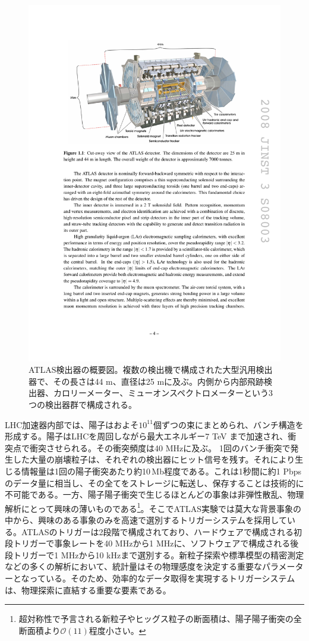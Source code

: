 \begin{figure} 
    \centering
    \includegraphics[width=16cm]{fig/Intro/ATLASdetector.pdf}
    \caption[ATLAS検出器の概要]{ATLAS検出器の概要図\cite{JINST:2008}。複数の検出機で構成された大型汎用検出器で、その長さは44 m、直径は25 mに及ぶ。内側から内部飛跡検出器、カロリーメーター、ミューオンスペクトロメーターという3つの検出器群で構成される。}
    \label{ATLASdetector}
\end{figure}

LHC加速器内部では、陽子はおよそ$10 ^ {11}$個ずつの束にまとめられ、バンチ構造を形成する。陽子はLHCを周回しながら最大エネルギー7 TeV まで加速され、衝突点で衝突させられる。その衝突頻度は40 MHzに及ぶ。
1回のバンチ衝突で発生した大量の崩壊粒子は、それぞれの検出器にヒット信号を残す。それにより生じる情報量は1回の陽子衝突あたり約10\,Mb程度である。これは1秒間に約1 Pbpsのデータ量に相当し、その全てをストレージに転送し、保存することは技術的に不可能である。一方、陽子陽子衝突で生じるほとんどの事象は非弾性散乱、物理解析にとって興味の薄いものである\footnote{超対称性で予言される新粒子やヒッグス粒子の断面積は、陽子陽子衝突の全断面積より$\mathcal{O}(11)$程度小さい。}。そこでATLAS実験では莫大な背景事象の中から、興味のある事象のみを高速で選別するトリガーシステムを採用している。ATLASのトリガーは2段階で構成されており、ハードウェアで構成される初段トリガーで事象レートを40 MHzから1 MHzに、ソフトウェアで構成される後段トリガーで1 MHzから10 kHzまで選別する。新粒子探索や標準模型の精密測定などの多くの解析において、統計量はその物理感度を決定する重要なパラメーターとなっている。そのため、効率的なデータ取得を実現するトリガーシステムは、物理探索に直結する重要な要素である。


